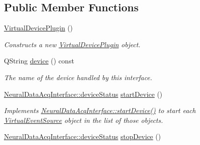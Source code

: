 \subsection*{Public Member Functions}
\begin{DoxyCompactItemize}
\item 
\hypertarget{class_virtual_device_plugin_a1b4b61ed19aff589260827203ee7ba83}{\hyperlink{class_virtual_device_plugin_a1b4b61ed19aff589260827203ee7ba83}{Virtual\-Device\-Plugin} ()}\label{class_virtual_device_plugin_a1b4b61ed19aff589260827203ee7ba83}

\begin{DoxyCompactList}\small\item\em Constructs a new \hyperlink{class_virtual_device_plugin}{Virtual\-Device\-Plugin} object. \end{DoxyCompactList}\item 
\hypertarget{class_virtual_device_plugin_af2f2429707d982e219789a9ded6049e1}{Q\-String \hyperlink{class_virtual_device_plugin_af2f2429707d982e219789a9ded6049e1}{device} () const }\label{class_virtual_device_plugin_af2f2429707d982e219789a9ded6049e1}

\begin{DoxyCompactList}\small\item\em The name of the device handled by this interface. \end{DoxyCompactList}\item 
\hypertarget{class_virtual_device_plugin_a7d6176c8c4b58857c33dbc309a99478d}{\hyperlink{class_neural_data_acq_interface_a18d2ffb89521e40cba91a159e47fd449}{Neural\-Data\-Acq\-Interface\-::device\-Status} \hyperlink{class_virtual_device_plugin_a7d6176c8c4b58857c33dbc309a99478d}{start\-Device} ()}\label{class_virtual_device_plugin_a7d6176c8c4b58857c33dbc309a99478d}

\begin{DoxyCompactList}\small\item\em Implements \hyperlink{class_neural_data_acq_interface_afaece5bd061753aa9a4b1e05c0d1e61d}{Neural\-Data\-Acq\-Interface\-::start\-Device()} to start each \hyperlink{class_virtual_event_source}{Virtual\-Event\-Source} object in the list of those objects. \end{DoxyCompactList}\item 
\hypertarget{class_virtual_device_plugin_abf30e433d584a282918d7ac03fd32f5a}{\hyperlink{class_neural_data_acq_interface_a18d2ffb89521e40cba91a159e47fd449}{Neural\-Data\-Acq\-Interface\-::device\-Status} \hyperlink{class_virtual_device_plugin_abf30e433d584a282918d7ac03fd32f5a}{stop\-Device} ()}\label{class_virtual_device_plugin_abf30e433d584a282918d7ac03fd32f5a}


\end{DoxyCompactItemize}
